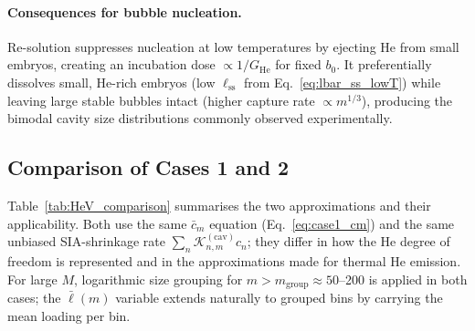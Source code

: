 \documentclass[pdflatex,sn-basic]{sn-jnl} %
\begin{document}
\paragraph{Consequences for bubble nucleation.}
Re-solution suppresses nucleation at low temperatures by ejecting He
from small embryos, creating an incubation dose $\propto 1/G_{\mathrm{He}}$
for fixed $b_0$. It preferentially dissolves small, He-rich embryos
(low $\ell_{\mathrm{ss}}$ from Eq.~\ref{eq:lbar_ss_lowT}) while leaving
large stable bubbles intact (higher capture rate $\propto m^{1/3}$),
producing the bimodal cavity size distributions commonly observed
experimentally.

\subsection{Comparison of Cases 1 and 2}
\label{sec:comparison}

Table~\ref{tab:HeV_comparison} summarises the two approximations and
their applicability. Both use the same $\bar{c}_m$ equation
(Eq.~\ref{eq:case1_cm}) and the same unbiased SIA-shrinkage rate
$\sum_n \mathcal{K}_{n,m}^{(\mathrm{cav})} c_n$; they differ in how
the He degree of freedom is represented and in the approximations made
for thermal He emission. For large $M$, logarithmic size grouping for
$m > m_{\mathrm{group}} \approx 50$--200 is applied in both cases; the
$\bar{\ell}(m)$ variable extends naturally to grouped bins by carrying
the mean loading per bin.
\end{document}
